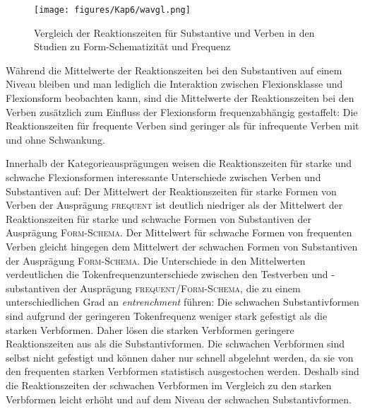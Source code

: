 \begin{figure}
\texttt{[image: figures/Kap6/wavgl.png]} 
\caption{Vergleich der Reaktionszeiten für Substantive und Verben in den Studien zu Form-Schematizität und Frequenz}
\label{wavgl}
\end{figure}

Während die Mittelwerte der Reaktionszeiten bei den Substantiven auf einem Niveau bleiben und man lediglich die Interaktion zwischen Flexionsklasse und Flexionsform beobachten kann, sind die Mittelwerte der Reaktionszeiten bei den Verben zusätzlich zum Einfluss der Flexionsform frequenzabhängig gestaffelt: Die Reaktionszeiten für frequente Verben sind geringer als für infrequente Verben mit und ohne Schwankung. 


Innerhalb der Kategorieausprägungen weisen die Reaktionszeiten für starke und schwache Flexionsformen interessante Unterschiede zwischen Verben und Substantiven auf: Der Mittelwert der Reaktionszeiten für starke Formen von Verben der Ausprägung \textsc{frequent} ist deutlich niedriger als der Mittelwert der Reaktionszeiten für starke und schwache Formen von Substantiven der Ausprägung \textsc{Form-Schema}. Der Mittelwert für schwache Formen von frequenten Verben gleicht hingegen dem Mittelwert der schwachen Formen von Substantiven der Ausprägung \textsc{Form-Schema}. Die Unterschiede in den Mittelwerten verdeutlichen die Tokenfrequenzunterschiede zwischen den Testverben und -sub\-stan\-ti\-ven der Ausprägung \textsc{frequent/Form-Schema}, die zu einem unterschiedlichen Grad an \textit{entrenchment} führen: Die schwachen Substantivformen sind aufgrund der geringeren Tokenfrequenz weniger stark gefestigt als die starken Verbformen. Daher lösen die starken Verbformen geringere Reaktionszeiten aus als die Substantivformen. Die schwachen Verbformen sind selbst nicht gefestigt und können daher nur schnell abgelehnt werden, da sie von den frequenten starken Verbformen statistisch ausgestochen werden. Deshalb sind die Reaktionszeiten der schwachen Verbformen im Vergleich zu den starken Verbformen leicht erhöht und auf dem Niveau der schwachen Substantivformen.  

